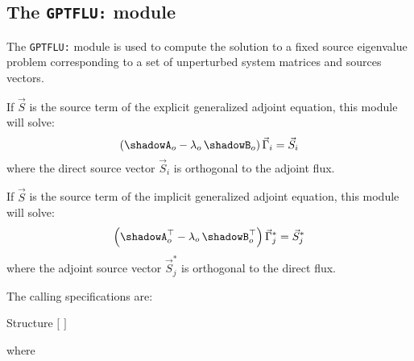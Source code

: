 \subsection{The {\tt GPTFLU:} module}

The {\tt GPTFLU:} module is used to compute the solution to a fixed source eigenvalue
problem corresponding to a set of unperturbed system matrices and sources vectors.

If $\vec S$ is the source term of the explicit generalized adjoint equation, this
module will solve:
\begin{equation}
\left( \shadowA_o - \lambda_o \, \shadowB_o\right) \vec \Gamma_{i} = \vec S_{i}
\end{equation}
\noindent where the direct source vector $\vec S_{i}$ is orthogonal to the adjoint flux.

If $\vec S$ is the source term of the implicit generalized adjoint equation, this
module will solve:
\begin{equation}
\left( \shadowA_o^\top - \lambda_o \, \shadowB_o^\top\right) \vec \Gamma_{j}^* = \vec S_{j}^{*}
\end{equation}
\noindent where the adjoint source vector $\vec S_{j}^*$ is orthogonal to the direct flux.

The calling specifications are:

\begin{DataStructure}{Structure }
 \moc{:=}  $[$  $]$     \moc{::} 
\end{DataStructure}

\goodbreak
\noindent where

